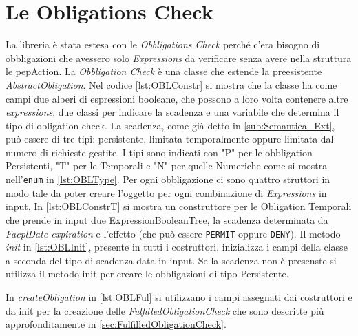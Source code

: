 \section{Le Obligations Check}
\label{sec:Le Obligations Check}
La libreria è stata estesa con le \emph{Obbligations Check} perché c'era bisogno di obbligazioni che avessero solo
\emph{Expressions} da verificare senza avere nella struttura le pepAction.
La \emph{Obbligation Check} è una classe che estende la preesistente \emph{AbstractObligation}.
Nel codice \ref{lst:OBLConstr} si mostra che la classe ha come campi due alberi di espressioni booleane, che possono
a loro volta contenere altre \emph{expressions}, due classi per indicare la scadenza e una variabile che determina
il tipo di obligation check.
La scadenza, come già detto in \ref{sub:Semantica_Ext}, può essere di tre tipi: persistente,
limitata temporalmente oppure limitata dal numero di richieste gestite. I tipi sono indicati con "P" per le obbligation Persistenti,
"T" per le Temporali e "N" per quelle Numeriche come si mostra nell'\texttt{enum} in \ref{lst:OBLType}.
Per ogni obbligazione ci sono quattro struttori in modo tale da poter creare l'oggetto per ogni combinazione di \emph{Expressions}
in input. In \ref{lst:OBLConstrT} si mostra un construttore per le Obligation Temporali che prende in input due ExpressionBooleanTree,
la scadenza determinata da \emph{FacplDate expiration} e l'effetto (che può essere \texttt{PERMIT} oppure \texttt{DENY}).
Il metodo \emph{init} in \ref{lst:OBLInit}, presente in tutti i costruttori, inizializza i campi della classe a seconda del tipo di scadenza data
in input. Se la scadenza non è presenste si utilizza il metodo init per creare le obbligazioni di tipo Persistente.

In \emph{createObligation} in \ref{lst:OBLFul} si utilizzano i campi assegnati dai costruttori
e da init per la creazione delle \emph{FulfilledObligationCheck}
che sono descritte più approfonditamente in \ref{sec:FulfilledObligationCheck}.


